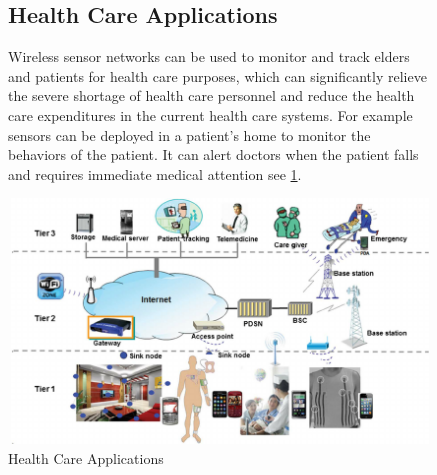 	\begin{figure}
	\subsection{Health Care Applications}
		Wireless  sensor  networks  can  be  used  to  monitor  and track  elders  and  patients  for  health  care  purposes,  which can significantly relieve the severe shortage of health care personnel  and  reduce  the  health  care  expenditures  in  the current  health  care  systems.  For  example  sensors  can  be deployed in a patient’s home to monitor the behaviors  of the patient. It can alert doctors when the patient falls and requires immediate medical attention\cite{application} see \ref{fig:x Health_Care_Applications}.
		
		
		
		\hfill
		\includegraphics[scale=0.5,width=12cm,height=6.5cm]{photos/healthcare.png}
		\caption{Health Care Applications}
			\centering
		\label{fig:x Health_Care_Applications}
		\hspace*{\fill}
	\end{figure}
		
			
	
